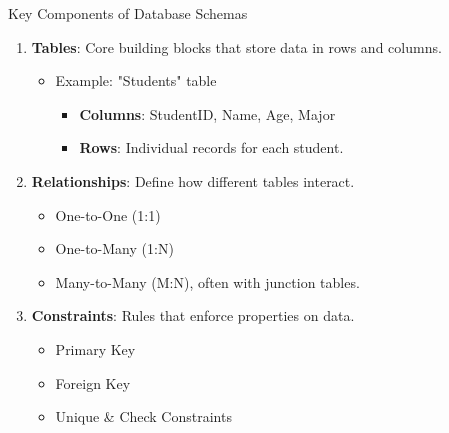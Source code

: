 \documentclass[aspectratio=169]{beamer}
\begin{document}
\begin{frame}[fragile]{Key Components of Database Schemas}
    \begin{enumerate}
        \item \textbf{Tables}: Core building blocks that store data in rows and columns.
            \begin{itemize}
                \item Example: "Students" table
                \begin{itemize}
                    \item \textbf{Columns}: StudentID, Name, Age, Major
                    \item \textbf{Rows}: Individual records for each student.
                \end{itemize}
            \end{itemize}
        \item \textbf{Relationships}: Define how different tables interact.
            \begin{itemize}
                \item One-to-One (1:1)
                \item One-to-Many (1:N)
                \item Many-to-Many (M:N), often with junction tables.
            \end{itemize}
        \item \textbf{Constraints}: Rules that enforce properties on data.
            \begin{itemize}
                \item Primary Key
                \item Foreign Key
                \item Unique \& Check Constraints
            \end{itemize}
    \end{enumerate}
\end{frame}
\end{document}
